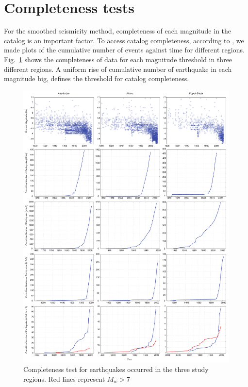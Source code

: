\section{Completeness tests}
For the smoothed seismicity method, completeness of each magnitude in the catalog is an important factor. To access catalog completeness, according to \citet{Frankel1995}, we made plots of the cumulative number of events against time for different regions.   Fig.~\ref{fig:comptest} shows the completeness of data for each magnitude threshold in three different regions.
A uniform rise of cumulative number of earthquake in each magnitude big, defines the threshold for catalog completeness.

\begin{figure} [H]
\centering
\includegraphics[scale=0.3]{figures/pdf/Figure4.pdf} 
\caption{Completeness test for earthquakes occurred in the three study regions. Red lines represent $M_w > 7$ }
\label{fig:comptest}
\end{figure}

